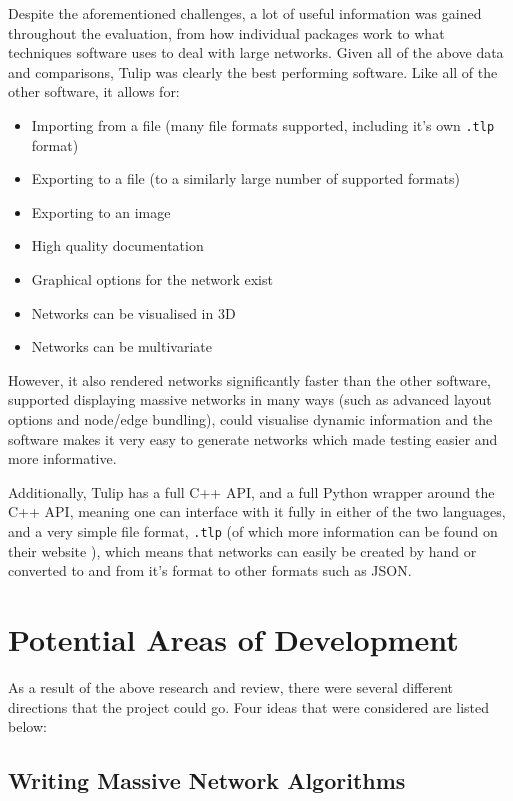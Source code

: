 \documentclass[../dissertation.tex]{subfiles}
\begin{document}
Despite the aforementioned challenges, a lot of useful information was gained throughout the evaluation, from how individual packages work to what techniques software uses to deal with large networks. Given all of the above data and comparisons, Tulip was clearly the best performing software. Like all of the other software, it allows for:
\begin{itemize}
    \item Importing from a file (many file formats supported, including it's own \texttt{.tlp} format)
    \item Exporting to a file (to a similarly large number of supported formats)
    \item Exporting to an image
    \item High quality documentation
    \item Graphical options for the network exist
    \item Networks can be visualised in 3D
    \item Networks can be multivariate
\end{itemize}

However, it also rendered networks significantly faster than the other software, supported displaying massive networks in many ways (such as advanced layout options and node/edge bundling), could visualise dynamic information and the software makes it very easy to generate networks which made testing easier and more informative. 

Additionally, Tulip has a full C++ API, and a full Python wrapper around the C++ API, meaning one can interface with it fully in either of the two languages, and a very simple file format, \texttt{.tlp} (of which more information can be found on their website \cite{tuliptlp}), which means that networks can easily be created by hand or converted to and from it's format to other formats such as JSON.

\section{Potential Areas of Development}

As a result of the above research and review, there were several different directions that the project could go. Four ideas that were considered are listed below:

\subsection{Writing Massive Network Algorithms}
\end{document}
